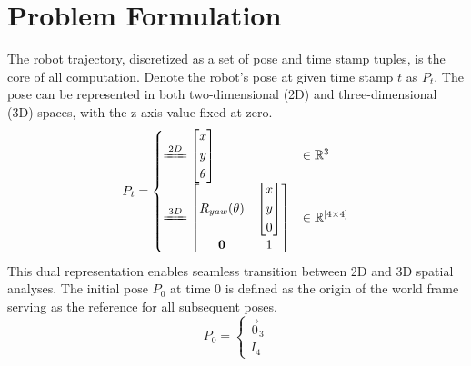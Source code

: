 \documentclass[conference]{IEEEtran}
\begin{document}
\section{Problem Formulation}
The robot trajectory, discretized as a set of pose and time stamp tuples, is the core of all computation.
Denote the robot's pose at given time stamp \(t\) as \(P_t\).
The pose can be represented in both two-dimensional (2D) and three-dimensional (3D) spaces, 
with the z-axis value fixed at zero. 
$$
P_{t} = \begin{cases}
    \xlongequal{2D} \left[ \begin{gathered}x\\ y\\ \theta \end{gathered} \right] & \in \mathbb{R}^{3} \\ 
    \xlongequal{3D} \left[ \begin{matrix}R_{yaw}(\theta )&\left[ \begin{gathered}x\\ y\\0\end{gathered} \right]  \\ \mathbf{0}&1\end{matrix} \right] & \in \mathbb{R}^{[4\times 4]}
\end{cases} 
$$
This dual representation enables seamless transition between 2D and 3D spatial analyses.
The initial pose $P_0$ at time 0 is defined as the origin of the world frame
serving as the reference for all subsequent poses.
$$P_{0}=\begin{cases}\vec{0}_{3}\\ I_{4}\end{cases} $$
\end{document}
